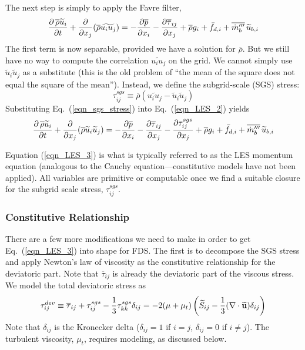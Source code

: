 The next step is simply to apply the Favre filter,
\begin{equation}
\label{eqn_LES_2}
\frac{\partial \,\overline{\rho} \widetilde{u}_i}{\partial t} + \frac{\partial}{\partial x_j} (\overline{\rho} \widetilde{u_i u_j}) = -\frac{\partial \overline{p}}{\partial x_i} - \frac{\partial \overline{\tau}_{ij}}{\partial x_j} + \overline{\rho} g_i + \bar{f}_{d,i} + \overline{\dot{m}_b^{\prime\prime\prime}} \, \widetilde{u}_{b,i}
\end{equation}
The first term is now separable, provided we have a solution for $\overline{\rho}$. But we still have no way to compute the correlation $\widetilde{u_i u_j}$ on the grid. We cannot simply use $\widetilde{u}_i \widetilde{u}_j$ as a substitute (this is the old problem of ``the mean of the square does not equal the square of the mean''). Instead, we define the subgrid-scale (SGS) stress:
\begin{equation}
\label{eqn_sgs_stress}
\tau_{ij}^{sgs} \equiv \overline{\rho} ( \widetilde{u_i u_j} - \widetilde{u}_i \widetilde{u}_j )
\end{equation}
Substituting Eq.~(\ref{eqn_sgs_stress}) into Eq.~(\ref{eqn_LES_2}) yields
\begin{equation}
\label{eqn_LES_3}
\frac{\partial \,\overline{\rho} \widetilde{u}_i}{\partial t} + \frac{\partial}{\partial x_j} (\overline{\rho} \widetilde{u}_i \widetilde{u}_j) = -\frac{\partial \overline{p}}{\partial x_i} - \frac{\partial \overline{\tau}_{ij}}{\partial x_j} - \frac{\partial \tau_{ij}^{sgs}}{\partial x_j} + \overline{\rho} g_i + \bar{f}_{d,i} + \overline{\dot{m}_b^{\prime\prime\prime}} \, \widetilde{u}_{b,i}
\end{equation}

Equation (\ref{eqn_LES_3}) is what is typically referred to as the LES momentum equation (analogous to the Cauchy equation---constitutive models have not been applied).  All variables are primitive or computable once we find a suitable closure for the subgrid scale stress, $\tau_{ij}^{sgs}$.

\subsubsection*{Constitutive Relationship}

There are a few more modifications we need to make in order to get Eq.~(\ref{eqn_LES_3}) into shape for FDS.  The first is to decompose the SGS stress and apply Newton's law of viscosity as the constitutive relationship for the deviatoric part.  Note that $\overline{\tau}_{ij}$ is already the deviatoric part of the viscous stress.  We model the total deviatoric stress as
\begin{equation}
\label{eqn_newtons_law_sgs}
\tau_{ij}^{dev} \equiv \overline{\tau}_{ij} + \tau_{ij}^{sgs} - \frac{1}{3}\tau_{kk}^{sgs}\delta_{ij} = - 2 (\mu + \mu_t) \left(\widetilde{S}_{ij} - \frac{1}{3}(\nabla\cdot \widetilde{\mathbf{u}}) \delta_{ij} \right)
\end{equation}
Note that $\delta_{ij}$ is the Kronecker delta ($\delta_{ij}=1$ if $i=j$, $\delta_{ij}=0$ if $i\ne j$).  The turbulent viscosity, $\mu_t$, requires modeling, as discussed below.

